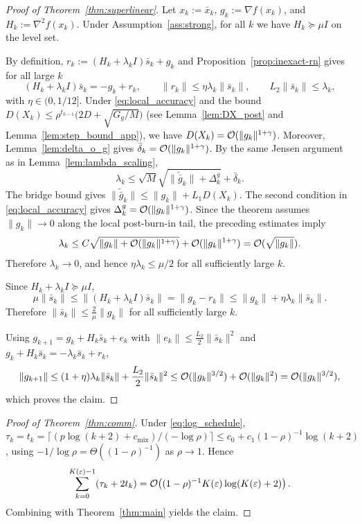 \documentclass[review,onefignum,onetabnum]{siamart171218}
\begin{document}
	\begin{proof}[Proof of Theorem~\ref{thm:superlinear}]
		Let $x_k:=\bar x_k$, $g_k:=\nabla f(x_k)$, and $H_k:=\nabla^2 f(x_k)$.
		Under Assumption~\ref{ass:strong}, for all $k$ we have $H_k\succeq \mu I$ on the level set.
		
		By definition, $r_k:=(H_k+\lambda_k I)\bar s_k+g_k$ and Proposition~\ref{prop:inexact-rn} gives for all large $k$
		\[
		(H_k+\lambda_k I)\bar s_k=-g_k+r_k,\qquad \|r_k\|\le \eta\lambda_k\|\bar s_k\|,\qquad L_2\|\bar s_k\|\le \lambda_k,
		\]
		with $\eta\in(0,1/12]$.
		Under \eqref{eq:local_accuracy} and the bound
		$D(X_k)\le \rho^{t_{k-1}}\bigl(2D+\sqrt{G_g/M}\bigr)$
		(see Lemma~\ref{lem:DX_post} and Lemma~\ref{lem:step_bound_app}),
		we have $D(X_k)=\mathcal{O}(\|g_k\|^{1+\gamma})$.
		Moreover, Lemma~\ref{lem:delta_o_g} gives
		$\bar\delta_k=\mathcal{O}(\|g_k\|^{1+\gamma})$.
		By the same Jensen argument as in Lemma~\ref{lem:lambda_scaling},
		\[
		\lambda_k
		\le \sqrt{M}\sqrt{\|\tilde{\bar g}_k\|+\Delta_k^g}
		+\bar\delta_k .
		\]
		The bridge bound gives
		$\|\tilde{\bar g}_k\|\le \|g_k\|+L_1D(X_k)$.
		The second condition in \eqref{eq:local_accuracy} gives
		$\Delta_k^g=\mathcal{O}(\|g_k\|^{1+\gamma})$.
		Since the theorem assumes $\|g_k\|\to0$ along the local
		post-burn-in tail, the preceding estimates imply
		\[
		\lambda_k
		\le C\sqrt{\|g_k\|+\mathcal{O}(\|g_k\|^{1+\gamma})}
		+\mathcal{O}(\|g_k\|^{1+\gamma})
		=\mathcal{O}(\sqrt{\|g_k\|}).
		\]
		Therefore $\lambda_k\to0$, and hence
		$\eta\lambda_k\le \mu/2$ for all sufficiently large $k$.
		
		Since $H_k+\lambda_k I\succeq \mu I$,
		\[
		\mu\|\bar s_k\|\le \|(H_k+\lambda_k I)\bar s_k\|=\|g_k-r_k\|\le \|g_k\|+\eta\lambda_k\|\bar s_k\|.
		\]
		Therefore $\|\bar s_k\|\le \frac{2}{\mu}\|g_k\|$ for all sufficiently large $k$.
		
		Using $g_{k+1}=g_k+H_k\bar s_k+e_k$ with $\|e_k\|\le \frac{L_2}{2}\|\bar s_k\|^2$ and $g_k+H_k\bar s_k=-\lambda_k\bar s_k+r_k$,
		\[
		\|g_{k+1}\|\le (1+\eta)\lambda_k\|\bar s_k\|+\frac{L_2}{2}\|\bar s_k\|^2
		\le \mathcal{O}(\|g_k\|^{3/2})+\mathcal{O}(\|g_k\|^2)=\mathcal{O}(\|g_k\|^{3/2}),
		\]
		which proves the claim.
	\end{proof}
	
	
	
	\begin{proof}[Proof of Theorem~\ref{thm:comm}]
		Under \eqref{eq:log_schedule},
		$\tau_k=t_k=\lceil(p\log(k+2)+c_{\mathrm{mix}})/(-\log\rho)\rceil
		\le c_0+c_1(1-\rho)^{-1}\log(k+2)$,
		using $-1/\log\rho=\Theta((1-\rho)^{-1})$ as $\rho\to1$.
		Hence
		\[
		\sum_{k=0}^{K(\varepsilon)-1}(\tau_k+2t_k)
		=\mathcal{O}\!\left((1-\rho)^{-1}K(\varepsilon)\log(K(\varepsilon)+2)\right).
		\]
		Combining with Theorem~\ref{thm:main} yields the claim.
	\end{proof}
	
\end{document}
